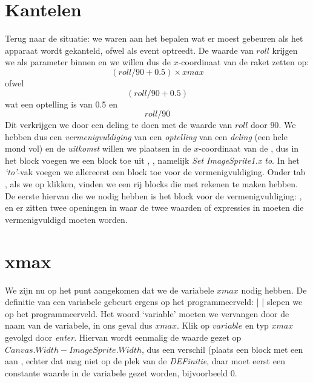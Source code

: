 \section{Kantelen}
Terug naar de situatie: we waren aan het bepalen wat er moest gebeuren als het apparaat wordt gekanteld, ofwel als event   optreedt. De waarde van $roll$ krijgen we als parameter binnen en we willen dus de $x$-coordinaat van de raket zetten op: 
\[
	(roll/90 + 0.5)  \times  xmax
\]
ofwel
\[
	(roll/90 + 0.5)
\]
wat een optelling is van 0.5 en
\[
	roll/90
\]
Dit verkrijgen we door een deling te doen met de waarde van $roll$ door $90$. 
We hebben dus een \emph{vermenigvuldiging} van een \emph{optelling} van een \emph{deling} (een hele mond vol) en de \emph{uitkomst} willen we plaatsen in de $x$-coordinaat van de , dus in het block 
\linebreak {} voegen we een block toe uit , , namelijk \emph{Set ImageSprite1.x to}.
In het \emph{`to'}-vak voegen we allereerst een block toe voor de vermenigvuldiging. Onder tab , als we op  klikken, vinden we een rij blocks die met rekenen te maken hebben. De eerste hiervan die we nodig hebben is het block voor de vermenigvuldiging: \block{$\times$}, en er zitten twee openingen in waar de twee waarden of expressies in moeten die vermenigvuldigd moeten worden. 



\section{xmax}
We zijn nu op het punt aangekomen dat we de variabele $xmax$ nodig hebben. De definitie van een variabele gebeurt ergens op het programmeerveld:  |  |  slepen we op het programmeerveld. Het woord `variable' moeten we vervangen door de naam van de variabele, in ons geval dus $xmax$. Klik op $variable$ en typ $xmax$ gevolgd door \emph{enter}. Hiervan wordt eenmalig de waarde gezet op $Canvas.Width - ImageSprite.Width$, dus een verschil (plaats een block met een \block{-} aan , echter dat mag niet op de plek van de \emph{DEFinitie}, daar moet eerst een constante waarde in de variabele gezet worden, bijvoorbeeld $0$. 


